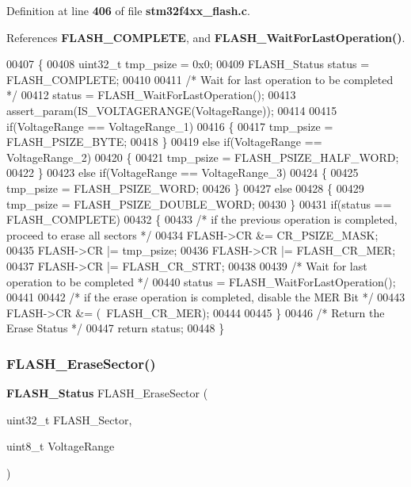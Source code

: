 Definition at line \textbf{ 406} of file \textbf{ stm32f4xx\+\_\+flash.\+c}.



References \textbf{ F\+L\+A\+S\+H\+\_\+\+C\+O\+M\+P\+L\+E\+TE}, and \textbf{ F\+L\+A\+S\+H\+\_\+\+Wait\+For\+Last\+Operation()}.


\begin{DoxyCode}
00407 \{
00408   uint32\_t tmp\_psize = 0x0;
00409   FLASH_Status status = FLASH_COMPLETE;
00410   
00411   \textcolor{comment}{/* Wait for last operation to be completed */}
00412   status = FLASH_WaitForLastOperation();
00413   assert_param(IS_VOLTAGERANGE(VoltageRange));
00414   
00415   \textcolor{keywordflow}{if}(VoltageRange == VoltageRange_1)
00416   \{
00417      tmp\_psize = FLASH_PSIZE_BYTE;
00418   \}
00419   \textcolor{keywordflow}{else} \textcolor{keywordflow}{if}(VoltageRange == VoltageRange_2)
00420   \{
00421     tmp\_psize = FLASH_PSIZE_HALF_WORD;
00422   \}
00423   \textcolor{keywordflow}{else} \textcolor{keywordflow}{if}(VoltageRange == VoltageRange_3)
00424   \{
00425     tmp\_psize = FLASH_PSIZE_WORD;
00426   \}
00427   \textcolor{keywordflow}{else}
00428   \{
00429     tmp\_psize = FLASH_PSIZE_DOUBLE_WORD;
00430   \}  
00431   \textcolor{keywordflow}{if}(status == FLASH_COMPLETE)
00432   \{
00433     \textcolor{comment}{/* if the previous operation is completed, proceed to erase all sectors */}
00434      FLASH->CR &= CR_PSIZE_MASK;
00435      FLASH->CR |= tmp\_psize;
00436      FLASH->CR |= FLASH_CR_MER;
00437      FLASH->CR |= FLASH_CR_STRT;
00438     
00439     \textcolor{comment}{/* Wait for last operation to be completed */}
00440     status = FLASH_WaitForLastOperation();
00441 
00442     \textcolor{comment}{/* if the erase operation is completed, disable the MER Bit */}
00443     FLASH->CR &= (~FLASH_CR_MER);
00444 
00445   \}   
00446   \textcolor{comment}{/* Return the Erase Status */}
00447   \textcolor{keywordflow}{return} status;
00448 \}
\end{DoxyCode}
\mbox{\label{group__FLASH__Group2_ga48f408290b32a3aebbcad83a00fc447c}} 
\subsubsection{F\+L\+A\+S\+H\+\_\+\+Erase\+Sector()}
{\footnotesize\ttfamily \textbf{ F\+L\+A\+S\+H\+\_\+\+Status} F\+L\+A\+S\+H\+\_\+\+Erase\+Sector (\begin{DoxyParamCaption}\item[{uint32\+\_\+t}]{F\+L\+A\+S\+H\+\_\+\+Sector,  }\item[{uint8\+\_\+t}]{Voltage\+Range }\end{DoxyParamCaption})}



